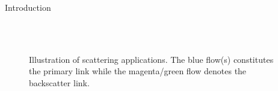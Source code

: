 \begin{section}{Introduction}
	\begin{figure}[!t]
		\centering
		\\
		\subfloat[\gls{sr}]{
			\resizebox{0.48\linewidth}{!}{
				
			}
			\label{fg:sr}
		}
		\\
		\subfloat[RIScatter]{
			\resizebox{0.48\linewidth}{!}{
				
			}
			\label{fg:riscatter}
		}
		\caption{
			Illustration of scattering applications.
			The blue flow(s) constitutes the primary link while the magenta/green flow denotes the backscatter link.
		}
		\label{fg:scatter_illustration}
	\end{figure}


\end{section}
